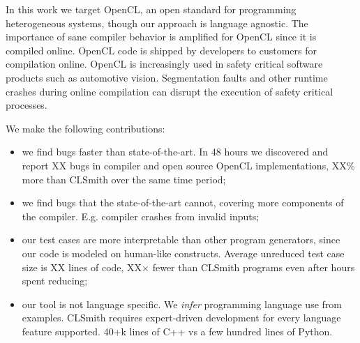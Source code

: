 In this work we target OpenCL, an open standard for programming heterogeneous systems, though our approach is language agnostic. The importance of sane compiler behavior is amplified for OpenCL since it is compiled online. OpenCL code is shipped by developers to customers for compilation online. OpenCL is increasingly used in safety critical software products such as automotive vision. Segmentation faults and other runtime crashes during online compilation can disrupt the execution of safety critical processes.

We make the following contributions:
%
\begin{itemize}
\item we find bugs faster than state-of-the-art. In 48 hours we discovered and report XX bugs in compiler and open source OpenCL implementations, XX\% more than CLSmith over the same time period;
\item we find bugs that the state-of-the-art cannot, covering more components of the compiler. E.g. compiler crashes from invalid inputs;
\item our test cases are more interpretable than other program generators, since our code is modeled on human-like constructs. Average unreduced test case size is XX lines of code, XX$\times$ fewer than CLSmith programs even after hours spent reducing;
\item our tool is not language specific. We \emph{infer} programming language use from examples. CLSmith requires expert-driven development for every language feature supported. 40+k lines of C++ vs a few hundred lines of Python.
\end{itemize}
